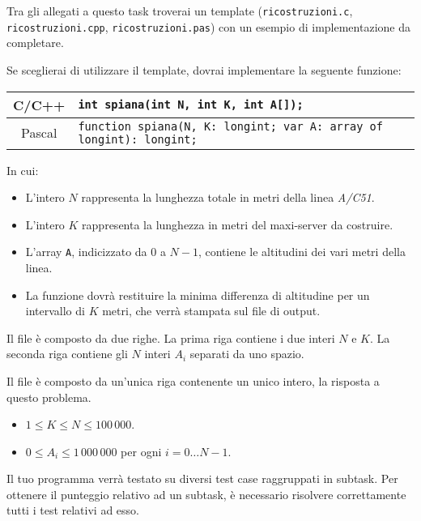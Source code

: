 \begin{warning}
Tra gli allegati a questo task troverai un template (\texttt{ricostruzioni.c}, \texttt{ricostruzioni.cpp}, \texttt{ricostruzioni.pas}) con un esempio di implementazione da completare.
\end{warning}

Se sceglierai di utilizzare il template, dovrai implementare la seguente funzione:
\begin{center}\begin{tabularx}{\textwidth}{|c|X|}
\hline
C/C++  & \verb|int spiana(int N, int K, int A[]);|\\
\hline
Pascal & \verb|function spiana(N, K: longint; var A: array of longint): longint;|\\
\hline
\end{tabularx}\end{center}
In cui:
\begin{itemize}[nolistsep]
  \item L'intero $N$ rappresenta la lunghezza totale in metri della linea \emph{A/C51}.
  \item L'intero $K$ rappresenta la lunghezza in metri del maxi-server da costruire.
  \item L'array \texttt{A}, indicizzato da $0$ a $N-1$, contiene le altitudini dei vari metri della linea.
  \item La funzione dovrà restituire la minima differenza di altitudine per un intervallo di $K$ metri, che verrà stampata sul file di output.
\end{itemize}

\InputFile
Il file  è composto da due righe. La prima riga contiene i due interi $N$ e $K$. La seconda riga contiene gli $N$ interi $A_i$ separati da uno spazio.

\OutputFile
Il file \outputfile{} è composto da un'unica riga contenente un unico intero, la risposta a questo problema.

\Constraints
\begin{itemize}[nolistsep, itemsep=2mm]
	\item $1 \le K \le N \le 100\,000$.
	\item $0 \le A_i \le 1\,000\,000$ per ogni $i=0\ldots N-1$.
\end{itemize}

\Scoring
Il tuo programma verrà testato su diversi test case raggruppati in subtask.
Per ottenere il punteggio relativo ad un subtask, è necessario risolvere
correttamente tutti i test relativi ad esso.

